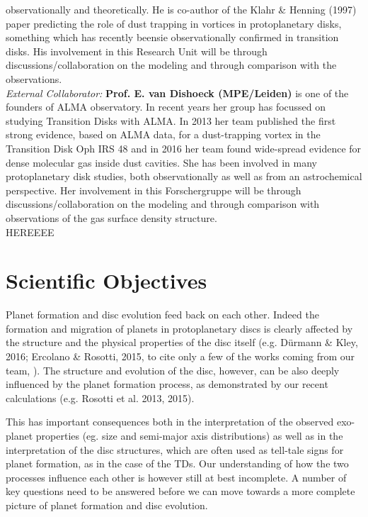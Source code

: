 \documentclass[12pt]{article}
\begin{document}
observationally and theoretically. He is co-author of the Klahr \&
Henning (1997) paper predicting the role of dust trapping in vortices
in protoplanetary disks, something which has recently beensie 
observationally confirmed in transition disks. His involvement in this
Research Unit will be through discussions/collaboration on the
modeling and through comparison with the observations. \\
{\it External Collaborator: } {\bf Prof. E. van Dishoeck (MPE/Leiden)}
is one of the founders of ALMA observatory. In recent years her group
has focussed on studying Transition Disks with ALMA. In 2013 her team
published the first strong evidence, based on ALMA data, for a
dust-trapping vortex in the Transition Disk Oph IRS 48 and in 2016 her team found wide-spread
 evidence for dense molecular gas inside dust cavities. She has been
involved in many protoplanetary disk studies, both observationally as
well as from an astrochemical perspective. Her involvement in this Forschergruppe
will be through discussions/collaboration on the modeling and through comparison with
 observations of the gas surface density structure.\\

HEREEEE

\section*{Scientific Objectives}

Planet formation and disc evolution feed back on each other. Indeed
the formation and migration of planets in protoplanetary discs is
clearly affected by the structure and the physical properties of the
disc itself (e.g. D\"urmann \& Kley, 2016; Ercolano \&
  Rosotti, 2015, to cite only a few of the works coming from our team, ). The
structure and evolution of the disc, however, can be also deeply
influenced by the planet formation process, as demonstrated by our
recent calculations (e.g. Rosotti et al. 2013, 2015). 

This has important consequences both in the interpretation of the observed
exo-planet properties (eg. size and semi-major axis distributions) as
well as in the interpretation of the disc structures, which are often
used as tell-tale signs for planet formation, as in the case of the
TDs. Our understanding of how the two processes
influence each other is however still at best incomplete. A number of
key questions need to be answered before we can move towards a more
complete picture of planet formation and disc evolution.
\end{document}
